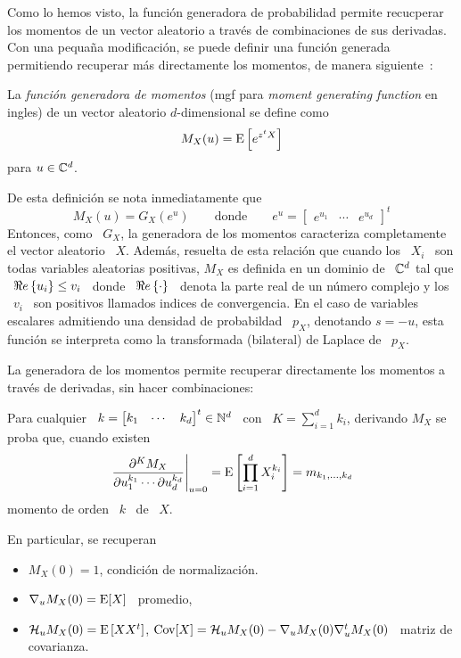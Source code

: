 
\label{Ssec:MP:GeneradoraMomentos}


Como lo hemos visto, la  funci\'on generadora de probabilidad permite recucperar
los  momentos  de  un  vector  aleatorio  a trav\'es  de  combinaciones  de  sus
derivadas.   Con una pequa\~na  modificaci\'on, se  puede definir  una funci\'on
generada  permitiendo  recuperar  m\'as  directamente los  momentos,  de  manera
siguiente~\cite{Fel68, JohKot97, Muk00, AthLah06}:
%
\begin{definicion}\label{Def:MP:GeneradoraMomentos}
  La {\em  funci\'on generadora  de momentos} (mgf  para {\em  moment generating
    function} en ingles) de un vector aleatorio $d$-dimensional se define como
  \[
  M_X(u) = \operatorname{E}\left[ e^{z^t X} \right]
  \]
  para $u \in \mathbb{C}^d$.
\end{definicion}
%
De esta definici\'on se nota inmediatamente que
%
\[
M_X(u) = G_X\left( e^u \right)  \qquad \mbox{donde} \qquad e^u = \begin{bmatrix}
  e^{u_1} & \cdots & e^{u_d} \end{bmatrix}^t
\]
%
Entonces, como \ $G_X$, la  generadora de los momentos caracteriza completamente
el vector aleatorio \ $X$. Adem\'as,  resuelta de esta relaci\'on que cuando los
\ $X_i$  \ son  todas variables  aleatorias positivas, $M_X$  es definida  en un
dominio de \ $\mathbb{C}^d$ tal que \ $\Re e \left\{ u_i \right\} \le v_i$ \ donde \ $\Re e \left\{ \cdot \right\}$ \
denota la  parte real  de un  n\'umero complejo y  los \  $v_i$ \  son positivos
llamados indices de convergencia.  En  el caso de variables escalares admitiendo
una  densidad de  probabildad \  $p_X$, denotando  $s =  -u$, esta  funci\'on se
interpreta como la transformada (bilateral) de Laplace de \ $p_X$.

La  generadora de  los momentos  permite recuperar  directamente los  momentos a
trav\'es de derivadas, sin hacer combinaciones:
%
\begin{lema}
  Para cualquier \  $k = \begin{bmatrix} k_1 & \cdots  & k_d \end{bmatrix}^t \in
  \mathbb{N}^d$ \ con \ $K =  \sum_{i=1}^d k_i$, derivando $M_X$ se proba que, cuando
  existen
  \[
  \left.\frac{\partial^K     M_X}{\partial     u_1^{k_1}     \cdots     \partial
      u_d^{k_d}}\right|_{u=0}  = \operatorname{E}\left[  \prod_{i=1}^d  X_i^{k_i} \right]  =
  m_{k_1,\ldots,k_d}
  \]
  momento de orden \ $k$ \ de \ $X$.
\end{lema}
%
En particular, se recuperan
%
\begin{itemize}
\item $M_X(0) = 1$, condici\'on de normalizaci\'on.
%
\item $\nabla_u M_X(0) = \operatorname{E}[X]$ \ promedio,
%
\item $\mathcal{H}_u M_X(0) = \operatorname{E}\left[ X X^t \right]$, \ie $\operatorname{Cov}[X] = \mathcal{H}_u M_X(0)
  - \nabla_u M_X(0) \nabla_u^t M_X(0)$ \ matriz de covarianza.
\end{itemize}

